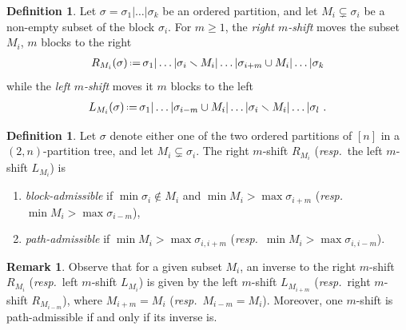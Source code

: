 \documentclass{amsart}
\newcommand{\darkblue}{\color{darkblue}} %
\theoremstyle{definition}
\newtheorem{definition}[theorem]{Definition}
\newtheorem{remark}[theorem]{Remark}
\newcommand{\ssm}{\smallsetminus} %
\newcommand{\eqdef}{\mbox{\,\raisebox{0.2ex}{\scriptsize\ensuremath{\mathrm:}}\ensuremath{=}\,}} %
\newcommand{\resp}{\textit{resp.}~} %
\newcommand{\defn}[1]{\textsl{\darkblue #1}} %
\begin{document}
\begin{definition}
\label{def:subset shifts}
Let $\sigma=\sigma_1|\dots|\sigma_k$ be an ordered partition, and let 
$M_i\subsetneq \sigma_{i}$ be a non-empty subset of the block $\sigma_i$.
For $m\geq 1$, the \defn{right $m$-shift} moves the subset $M_i$, $m$ blocks to the right  
\begin{align*}
	R_{M_i}(\sigma) \eqdef \sigma_1|\dots|\sigma_i \ssm M_i|\dots | \sigma_{i+m} \cup M_i|\dots|\sigma_k
\end{align*}
while the \defn{left $m$-shift} moves it $m$ blocks to the left 
\begin{align*}
	L_{M_{i}}(\sigma) \eqdef \sigma_1|\dots|\sigma_{i-m} \cup M_{i}| \dots |\sigma_{i} \ssm M_{i}|\dots|\sigma_l \ .
\end{align*}
\end{definition}

\begin{definition}
\label{def:movable-subsets}
Let $\sigma$ denote either one of the two ordered partitions of $[n]$ in a $(2,n)$-partition tree, and let $M_i \subsetneq \sigma_i$.
The right $m$-shift $R_{M_i}$ (\resp the left $m$-shift $L_{M_{i}}$) is 
\begin{enumerate}
	\item \defn{block-admissible} if $\min \sigma_i \notin M_i$ and $\min M_i> \max \sigma_{i+m}$ (\resp $\min M_{i}> \max \sigma_{i-m}$),
	\item \defn{path-admissible} if $\min M_i> \max \sigma_{i,i+m}$ (\resp $\min M_{i}> \max \sigma_{i,i-m}$).
\end{enumerate}
\end{definition}

\begin{remark}
\label{rem:inverses}
Observe that for a given subset $M_i$, an inverse to the right $m$-shift $R_{M_i}$ (\resp left $m$-shift $L_{M_i}$) is given by the left $m$-shift $L_{M_{i+m}}$ (\resp right $m$-shift $R_{M_{i-m}}$), where $M_{i+m}=M_i$ (\resp $M_{i-m}=M_i$).
Moreover, one $m$-shift is path-admissible if and only if its inverse is. 
\end{remark}
\end{document}
